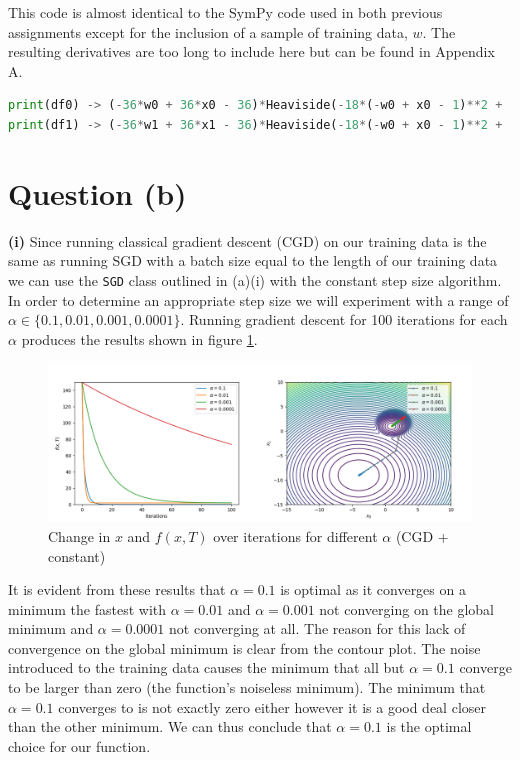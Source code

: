\documentclass[12pt]{article}
\begin{document}
This code is almost identical to the SymPy code used in both previous assignments except for the inclusion of a sample of training data, $w$. The resulting derivatives are too long to include here but can be found in Appendix A.

\lstset{basicstyle=\footnotesize}
\begin{lstlisting}[language=Python]
print(df0) -> (-36*w0 + 36*x0 - 36)*Heaviside(-18*(-w0 + x0 - 1)**2 + ...
print(df1) -> (-36*w1 + 36*x1 - 36)*Heaviside(-18*(-w0 + x0 - 1)**2 + ...
\end{lstlisting}

\section*{Question (b)}

\noindent \textbf{(i)} Since running classical gradient descent (CGD) on our training data is the same as running SGD with a batch size equal to the length of our training data we can use the \texttt{SGD} class outlined in (a)(i) with the constant step size algorithm. In order to determine an appropriate step size we will experiment with a range of $\alpha \in \{0.1, 0.01, 0.001, 0.0001\}$. Running gradient descent for 100 iterations for each $\alpha$ produces the results shown in figure \ref{fig:b_i}.

\begin{figure}[h]
    \hspace*{-0.45in}
    \includegraphics[scale=1.75]{figs/b/b_i.png}
    \caption{Change in $x$ and $f(x, T)$ over iterations for different $\alpha$ (CGD + constant)}
    \label{fig:b_i}
\end{figure}

It is evident from these results that $\alpha = 0.1$ is optimal as it converges on a minimum the fastest with $\alpha = 0.01$ and $\alpha = 0.001$ not converging on the global minimum and $\alpha = 0.0001$ not converging at all. The reason for this lack of convergence on the global minimum is clear from the contour plot. The noise introduced to the training data causes the minimum that all but $\alpha=0.1$ converge to be larger than zero (the function's noiseless minimum). The minimum that $\alpha=0.1$ converges to is not exactly zero either however it is a good deal closer than the other minimum. We can thus conclude that $\alpha=0.1$ is the optimal choice for our function.
\end{document}
